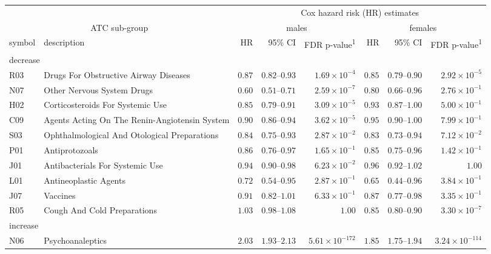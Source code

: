\setlength{\LTpost}{0mm}
\begin{longtable}{llrrrrrr}
\toprule
 &  & \multicolumn{6}{c}{Cox hazard risk (HR) estimates} \\ 
\cmidrule(lr){3-8}
\multicolumn{2}{c}{ATC sub-group} & \multicolumn{3}{c}{males} & \multicolumn{3}{c}{females} \\ 
\cmidrule(lr){1-2} \cmidrule(lr){3-5} \cmidrule(lr){6-8}
symbol & description & HR & 95\% CI & FDR p-value\textsuperscript{1} & HR & 95\% CI & FDR p-value\textsuperscript{1} \\ 
\midrule
\multicolumn{8}{l}{decrease} \\ 
\midrule
R03 & Drugs For Obstructive Airway Diseases & $0.87$ & $0.82$–$0.93$ & $1.69 \times 10^{-4}$ & $0.85$ & $0.79$–$0.90$ & $2.92 \times 10^{-5}$ \\ 
N07 & Other Nervous System Drugs & $0.60$ & $0.51$–$0.71$ & $2.59 \times 10^{-7}$ & $0.80$ & $0.66$–$0.96$ & $2.76 \times 10^{-1}$ \\ 
H02 & Corticosteroids For Systemic Use & $0.85$ & $0.79$–$0.91$ & $3.09 \times 10^{-5}$ & $0.93$ & $0.87$–$1.00$ & $5.00 \times 10^{-1}$ \\ 
C09 & Agents Acting On The Renin-Angiotensin System & $0.90$ & $0.86$–$0.94$ & $3.62 \times 10^{-5}$ & $0.95$ & $0.90$–$1.00$ & $7.99 \times 10^{-1}$ \\ 
S03 & Ophthalmological And Otological Preparations & $0.84$ & $0.75$–$0.93$ & $2.87 \times 10^{-2}$ & $0.83$ & $0.73$–$0.94$ & $7.12 \times 10^{-2}$ \\ 
P01 & Antiprotozoals & $0.86$ & $0.76$–$0.97$ & $1.65 \times 10^{-1}$ & $0.85$ & $0.75$–$0.96$ & $1.42 \times 10^{-1}$ \\ 
J01 & Antibacterials For Systemic Use & $0.94$ & $0.90$–$0.98$ & $6.23 \times 10^{-2}$ & $0.96$ & $0.92$–$1.02$ & $1.00$ \\ 
L01 & Antineoplastic Agents & $0.72$ & $0.54$–$0.95$ & $2.87 \times 10^{-1}$ & $0.65$ & $0.44$–$0.96$ & $3.84 \times 10^{-1}$ \\ 
J07 & Vaccines & $0.91$ & $0.82$–$1.01$ & $6.33 \times 10^{-1}$ & $0.87$ & $0.77$–$0.98$ & $3.35 \times 10^{-1}$ \\ 
R05 & Cough And Cold Preparations & $1.03$ & $0.98$–$1.08$ & $1.00$ & $0.85$ & $0.80$–$0.90$ & $3.30 \times 10^{-7}$ \\ 
\midrule
\multicolumn{8}{l}{increase} \\ 
\midrule
N06 & Psychoanaleptics & $2.03$ & $1.93$–$2.13$ & $5.61 \times 10^{-172}$ & $1.85$ & $1.75$–$1.94$ & $3.24 \times 10^{-114}$ \\ 

\end{longtable}
